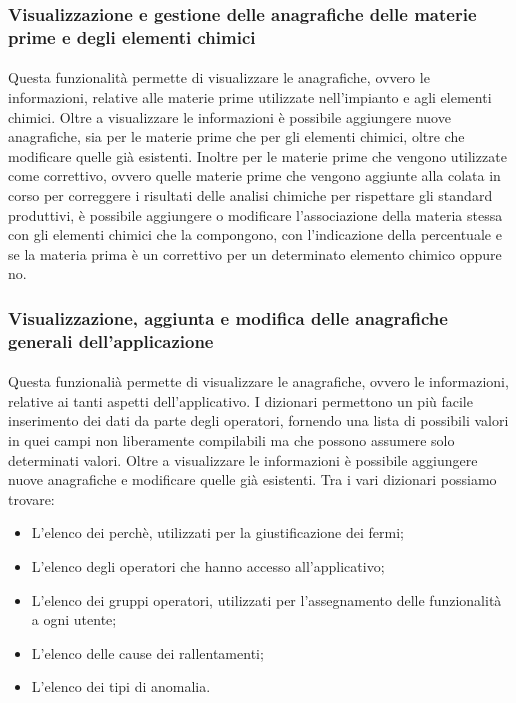   \subsubsection{Visualizzazione e gestione delle anagrafiche delle materie prime e degli elementi chimici}
  \paragraph{}
  Questa funzionalità permette di visualizzare le anagrafiche, ovvero le informazioni, relative alle 
  materie prime utilizzate nell’impianto e agli elementi chimici. Oltre a visualizzare le informazioni è 
  possibile aggiungere nuove anagrafiche, sia per le materie prime che per gli elementi chimici, oltre 
  che modificare quelle già esistenti. Inoltre per le materie prime che vengono utilizzate come correttivo, 
  ovvero quelle materie prime che vengono aggiunte alla colata in corso per correggere i risultati delle 
  analisi chimiche per rispettare gli standard produttivi, è possibile aggiungere o modificare l’associazione della 
  materia stessa con gli elementi chimici che la compongono, con l’indicazione della percentuale e se la 
  materia prima è un correttivo per un determinato elemento chimico oppure no.
  
  \subsubsection{Visualizzazione, aggiunta e modifica  delle anagrafiche generali dell’applicazione}
  \paragraph{}
  Questa funzionalià permette di visualizzare le anagrafiche, ovvero le informazioni, relative ai 
  tanti aspetti dell’applicativo. I dizionari permettono un più facile inserimento dei dati da parte 
  degli operatori, fornendo una lista di possibili valori in quei campi non liberamente compilabili ma 
  che possono assumere solo determinati valori. Oltre a visualizzare le informazioni è possibile aggiungere 
  nuove anagrafiche e modificare quelle già esistenti. Tra i vari dizionari possiamo trovare:
  \begin{itemize}
    \item L'elenco dei perchè, utilizzati per la giustificazione dei fermi;
    \item L'elenco degli operatori che hanno accesso all'applicativo;
    \item L'elenco dei gruppi operatori, utilizzati per l'assegnamento delle funzionalità a ogni utente;
    \item L'elenco delle cause dei rallentamenti;
    \item L'elenco dei tipi di anomalia.
  \end{itemize} 



